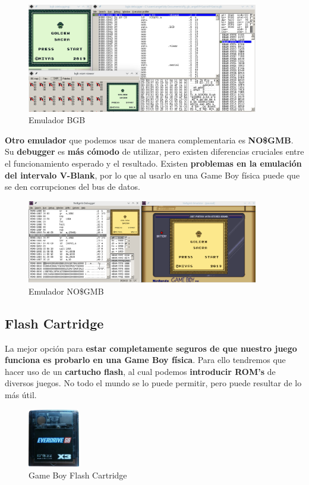 \begin{figure}[h]
\centering
\includegraphics[width=0.9\textwidth]{include/images/manual/bgb.png}
\caption{Emulador BGB}
\label{figure:bgb}
\end{figure}

\textbf{Otro emulador} que podemos usar de manera complementaria es \textbf{NO\$GMB}. Su \textbf{debugger} es \textbf{más cómodo} de utilizar, pero existen diferencias cruciales entre el funcionamiento esperado y el resultado. Existen \textbf{problemas en la emulación del intervalo V-Blank}, por lo que al usarlo en una Game Boy física puede que se den corrupciones del bus de datos.

\begin{figure}[h]
\centering
\includegraphics[width=0.9\textwidth]{include/images/manual/nogmb.png}
\caption{Emulador NO\$GMB}
\label{figure:bgb}
\end{figure}

\subsection{Flash Cartridge}

La mejor opción para \textbf{estar completamente seguros de que nuestro juego funciona es probarlo en una Game Boy física}. Para ello tendremos que hacer uso de un \textbf{cartucho flash}, al cual podemos \textbf{introducir ROM's} de diversos juegos. No todo el mundo se lo puede permitir, pero puede resultar de lo más útil.

\begin{figure}[h]
\centering
\includegraphics[width=0.2\textwidth]{include/images/manual/flashc.png}
\caption{Game Boy Flash Cartridge}
\label{figure:flashc}
\end{figure}

